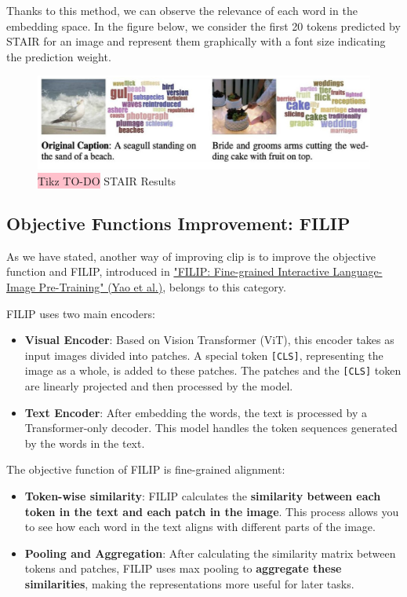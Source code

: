 Thanks to this method, we can observe the relevance of each word in the embedding space. In the figure below, we consider the first 20 tokens predicted by STAIR for an image and represent them graphically with a font size indicating the prediction weight.

\begin{figure}[!htbp]
    \centering
    \includegraphics[width=0.8\linewidth]{tikz/chapter11 - STAIR Results.png}
    \caption{{\color{red}\colorbox{pink}{Tikz TO-DO}} STAIR Results}
\end{figure}



\subsection{Objective Functions Improvement: FILIP}

As we have stated, another way of improving clip is to improve the objective function and FILIP, introduced in \href{https://arxiv.org/pdf/2111.07783}{"FILIP: Fine-grained Interactive Language-Image Pre-Training" (Yao et al.)}, belongs to this category. 

FILIP uses two main encoders:
\begin{itemize}
    \item \textbf{Visual Encoder}: Based on Vision Transformer (ViT), this encoder takes as input images divided into patches. A special token \texttt{[CLS]}, representing the image as a whole, is added to these patches. The patches and the \texttt{[CLS]} token are linearly projected and then processed by the model.
    \item \textbf{Text Encoder}: After embedding the words, the text is processed by a Transformer-only decoder. This model handles the token sequences generated by the words in the text.
\end{itemize}


The objective function of FILIP is fine-grained alignment:
\begin{itemize}
    \item \textbf{Token-wise similarity}: FILIP calculates the \textbf{similarity between each token in the text and each patch in the image}. This process allows you to see how each word in the text aligns with different parts of the image.
    \item \textbf{Pooling and Aggregation}: After calculating the similarity matrix between tokens and patches, FILIP uses max pooling to \textbf{aggregate these similarities}, making the representations more useful for later tasks.
\end{itemize}

